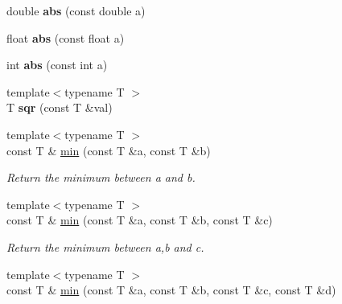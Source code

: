 \begin{DoxyCompactItemize}
\item 
\hypertarget{namespacecimg__library_1_1cimg_aeb9044e4ac488728765853de5603b89e}{double {\bfseries abs} (const double a)}\label{namespacecimg__library_1_1cimg_aeb9044e4ac488728765853de5603b89e}

\item 
\hypertarget{namespacecimg__library_1_1cimg_a46e350344966cbc2fd28c76644f89715}{float {\bfseries abs} (const float a)}\label{namespacecimg__library_1_1cimg_a46e350344966cbc2fd28c76644f89715}

\item 
\hypertarget{namespacecimg__library_1_1cimg_af10f05e6f2e19db9d5b3467fb469bd30}{int {\bfseries abs} (const int a)}\label{namespacecimg__library_1_1cimg_af10f05e6f2e19db9d5b3467fb469bd30}

\item 
\hypertarget{namespacecimg__library_1_1cimg_a3ac6482320322e3a607ab20a6cfa8c57}{{\footnotesize template$<$typename T $>$ }\\T {\bfseries sqr} (const T \&val)}\label{namespacecimg__library_1_1cimg_a3ac6482320322e3a607ab20a6cfa8c57}

\item 
\hypertarget{namespacecimg__library_1_1cimg_ad94384d3e36da5cb180e58c3daee5a21}{{\footnotesize template$<$typename T $>$ }\\const T \& \hyperlink{namespacecimg__library_1_1cimg_ad94384d3e36da5cb180e58c3daee5a21}{min} (const T \&a, const T \&b)}\label{namespacecimg__library_1_1cimg_ad94384d3e36da5cb180e58c3daee5a21}

\begin{DoxyCompactList}\small\item\em Return the minimum between {\ttfamily a} and {\ttfamily b}. \end{DoxyCompactList}\item 
\hypertarget{namespacecimg__library_1_1cimg_a0284ffcc1385c3f99210a8df7741bb80}{{\footnotesize template$<$typename T $>$ }\\const T \& \hyperlink{namespacecimg__library_1_1cimg_a0284ffcc1385c3f99210a8df7741bb80}{min} (const T \&a, const T \&b, const T \&c)}\label{namespacecimg__library_1_1cimg_a0284ffcc1385c3f99210a8df7741bb80}

\begin{DoxyCompactList}\small\item\em Return the minimum between {\ttfamily a},{\ttfamily b} and {\itshape c}. \end{DoxyCompactList}\item 
\hypertarget{namespacecimg__library_1_1cimg_af65426cf9156cb8a95dbe4f31eaba7d2}{{\footnotesize template$<$typename T $>$ }\\const T \& \hyperlink{namespacecimg__library_1_1cimg_af65426cf9156cb8a95dbe4f31eaba7d2}{min} (const T \&a, const T \&b, const T \&c, const T \&d)}\label{namespacecimg__library_1_1cimg_af65426cf9156cb8a95dbe4f31eaba7d2}


\end{DoxyCompactItemize}
